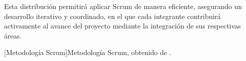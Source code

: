 Esta distribución permitirá aplicar Scrum de manera eficiente, asegurando un desarrollo iterativo y coordinado, en el que cada integrante contribuirá activamente al avance del proyecto mediante la integración de sus respectivas áreas.

\begin{center}
    [Metodología Scrum]{Metodología Scrum, obtenido de \cite{ref19}.}  %
\end{center}